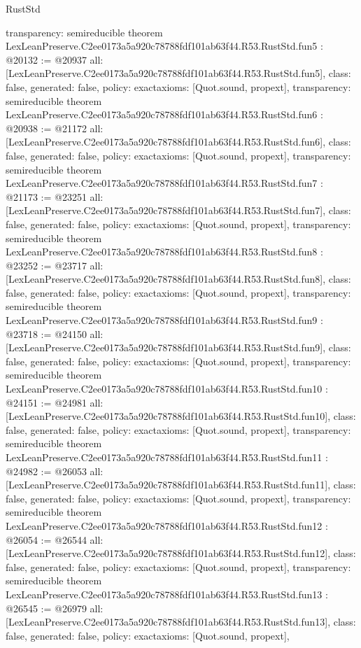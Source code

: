 \begin{lexlean}{RustStd}
\begin{coremodule}
{  transparency: semireducible
}
theorem LexLeanPreserve.C2ee0173a5a920c78788fdf101ab63f44.R53.RustStd.fun5 : @20132 := @20937 {
  all: [LexLeanPreserve.C2ee0173a5a920c78788fdf101ab63f44.R53.RustStd.fun5],
  class: false,
  generated: false,
  policy: exact{axioms: [Quot.sound, propext]},
  transparency: semireducible
}
theorem LexLeanPreserve.C2ee0173a5a920c78788fdf101ab63f44.R53.RustStd.fun6 : @20938 := @21172 {
  all: [LexLeanPreserve.C2ee0173a5a920c78788fdf101ab63f44.R53.RustStd.fun6],
  class: false,
  generated: false,
  policy: exact{axioms: [Quot.sound, propext]},
  transparency: semireducible
}
theorem LexLeanPreserve.C2ee0173a5a920c78788fdf101ab63f44.R53.RustStd.fun7 : @21173 := @23251 {
  all: [LexLeanPreserve.C2ee0173a5a920c78788fdf101ab63f44.R53.RustStd.fun7],
  class: false,
  generated: false,
  policy: exact{axioms: [Quot.sound, propext]},
  transparency: semireducible
}
theorem LexLeanPreserve.C2ee0173a5a920c78788fdf101ab63f44.R53.RustStd.fun8 : @23252 := @23717 {
  all: [LexLeanPreserve.C2ee0173a5a920c78788fdf101ab63f44.R53.RustStd.fun8],
  class: false,
  generated: false,
  policy: exact{axioms: [Quot.sound, propext]},
  transparency: semireducible
}
theorem LexLeanPreserve.C2ee0173a5a920c78788fdf101ab63f44.R53.RustStd.fun9 : @23718 := @24150 {
  all: [LexLeanPreserve.C2ee0173a5a920c78788fdf101ab63f44.R53.RustStd.fun9],
  class: false,
  generated: false,
  policy: exact{axioms: [Quot.sound, propext]},
  transparency: semireducible
}
theorem LexLeanPreserve.C2ee0173a5a920c78788fdf101ab63f44.R53.RustStd.fun10 : @24151 := @24981 {
  all: [LexLeanPreserve.C2ee0173a5a920c78788fdf101ab63f44.R53.RustStd.fun10],
  class: false,
  generated: false,
  policy: exact{axioms: [Quot.sound, propext]},
  transparency: semireducible
}
theorem LexLeanPreserve.C2ee0173a5a920c78788fdf101ab63f44.R53.RustStd.fun11 : @24982 := @26053 {
  all: [LexLeanPreserve.C2ee0173a5a920c78788fdf101ab63f44.R53.RustStd.fun11],
  class: false,
  generated: false,
  policy: exact{axioms: [Quot.sound, propext]},
  transparency: semireducible
}
theorem LexLeanPreserve.C2ee0173a5a920c78788fdf101ab63f44.R53.RustStd.fun12 : @26054 := @26544 {
  all: [LexLeanPreserve.C2ee0173a5a920c78788fdf101ab63f44.R53.RustStd.fun12],
  class: false,
  generated: false,
  policy: exact{axioms: [Quot.sound, propext]},
  transparency: semireducible
}
theorem LexLeanPreserve.C2ee0173a5a920c78788fdf101ab63f44.R53.RustStd.fun13 : @26545 := @26979 {
  all: [LexLeanPreserve.C2ee0173a5a920c78788fdf101ab63f44.R53.RustStd.fun13],
  class: false,
  generated: false,
  policy: exact{axioms: [Quot.sound, propext]},
}
\end{coremodule}
\end{lexlean}
